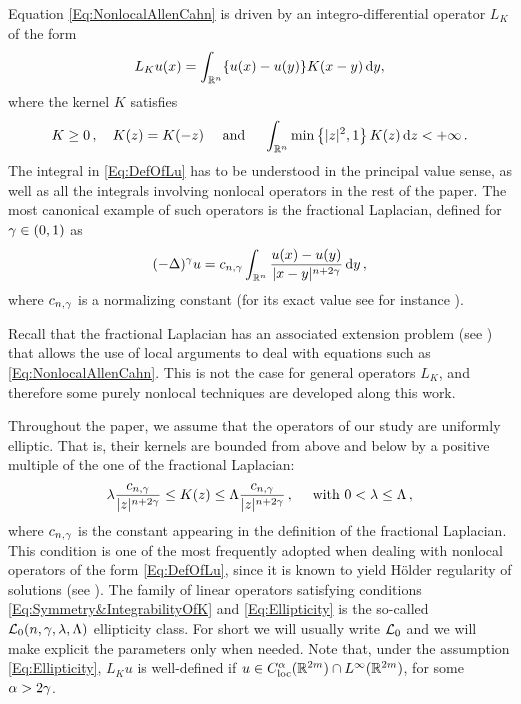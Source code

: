 Equation \eqref{Eq:NonlocalAllenCahn} is driven by an integro-differential operator $L_K$ of the form
\begin{equation}
\label{Eq:DefOfLu}
L_Ku(x) = \int_{\mathbb{R}^n} \{u(x) - u(y)\} K(x-y)\,\mathrm{d} y,
\end{equation}
where the kernel $K$ satisfies
\begin{equation}
\label{Eq:Symmetry&IntegrabilityOfK}
K\geq 0\,, \quad K(z) = K(-z) \quad \textrm{ and } \quad \int_{\mathbb{R}^n} \min \left\{ |z|^2, 1 \right\} K(z) \,\mathrm{d} z < + \infty\,.
\end{equation}
The integral in \eqref{Eq:DefOfLu} has to be understood in the principal value sense, as well as all the integrals involving nonlocal operators in the rest of the paper.
The most canonical example of such operators is the fractional Laplacian, defined for $\gamma\in(0,1)$ as
$$
(-\Delta)^\gamma u = c_{n, \gamma} \int_{\mathbb{R}^n} \dfrac{u(x) - u(y)}{|x-y|^{n + 2\gamma}}\,\mathrm{d} y\,,
$$
where $c_{n, \gamma}$ is a normalizing constant (for its exact value see for instance \cite{HitchhikerGuide}).

Recall that the fractional Laplacian has an associated extension problem (see \cite{CaffarelliSilvestre}) that allows the use of local arguments to deal with equations such as \eqref{Eq:NonlocalAllenCahn}. This is not the case for general operators $L_K$, and therefore some purely nonlocal techniques are developed along this work. 

Throughout the paper, we assume that the operators of our study are uniformly elliptic. That is, their kernels are bounded from above and below by a positive multiple of the one of the fractional Laplacian:
\begin{equation}
\label{Eq:Ellipticity}
\lambda \dfrac{c_{n,\gamma}}{|z|^{n+2\gamma}} \leq K(z) \leq \Lambda \dfrac{c_{n,\gamma}}{|z|^{n+2\gamma}}\,, \quad \text{ with }  0< \lambda \leq \Lambda \,,
\end{equation}
where $c_{n,\gamma}$ is the constant appearing in the definition of the fractional Laplacian. This condition is one of the most frequently adopted when dealing with nonlocal operators of the form \eqref{Eq:DefOfLu}, since it is known to yield Hölder regularity of solutions (see \cite{RosOton-Survey,SerraC2s+alphaRegularity}). The family of linear operators satisfying conditions \eqref{Eq:Symmetry&IntegrabilityOfK} and \eqref{Eq:Ellipticity} is the so-called $\mathcal{L}_0(n,\gamma,\lambda, \Lambda)$ ellipticity class. For short we will usually write $\mathcal{L}_0$ and we will make explicit the parameters only when needed. Note that, under the assumption \eqref{Eq:Ellipticity}, $L_K u$ is well-defined if $u\in C_{\rm loc}^\alpha(\mathbb{R}^{2m})\cap L^\infty(\mathbb{R}^{2m})$, for some $\alpha > 2 \gamma$.

